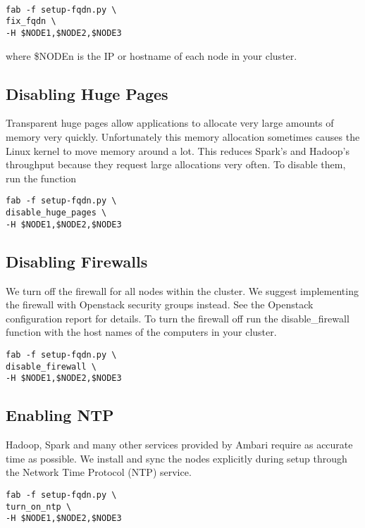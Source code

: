 \documentclass[9pt,twocolumn,twoside]{idsi}
\begin{document}
\begin{verbatim}

fab -f setup-fqdn.py \
fix_fqdn \
-H $NODE1,$NODE2,$NODE3

\end{verbatim}

where \$NODEn is the IP or hostname of each node in your cluster.

\subsection{Disabling Huge Pages}
Transparent huge pages allow applications to allocate very large amounts of memory very quickly. Unfortunately this memory allocation sometimes causes the Linux kernel to move memory around a lot. This reduces Spark's and Hadoop's throughput because they request large allocations very often. To disable them, run the  function

\begin{verbatim}
fab -f setup-fqdn.py \
disable_huge_pages \
-H $NODE1,$NODE2,$NODE3
\end{verbatim}

\subsection{Disabling Firewalls}

We turn off the firewall for all nodes within the cluster. We suggest implementing the firewall with Openstack security groups instead. See the Openstack configuration report for details. To turn the firewall off run the disable\_firewall function with the host names of the computers in your cluster.

\begin{verbatim}
fab -f setup-fqdn.py \
disable_firewall \
-H $NODE1,$NODE2,$NODE3
\end{verbatim}

\subsection{Enabling NTP}
Hadoop, Spark and many other services provided by Ambari require as accurate time as possible.  We install and sync the nodes explicitly during setup through the Network Time Protocol (NTP) service. 

\begin{verbatim}
fab -f setup-fqdn.py \
turn_on_ntp \
-H $NODE1,$NODE2,$NODE3
\end{verbatim}
\end{document}
